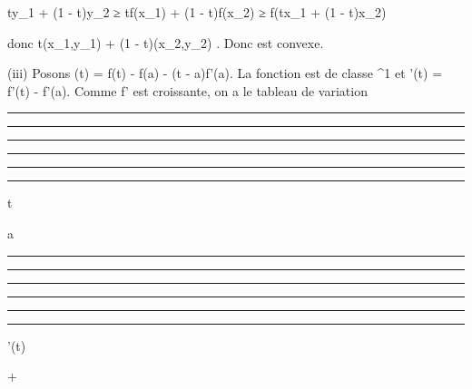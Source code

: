 \documentclass[]{article}
\begin{document}
ty\_1 + (1 - t)y\_2 ≥ tf(x\_1) + (1 -
t)f(x\_2) ≥ f(tx\_1 + (1 - t)x\_2)

donc t(x\_1,y\_1) + (1 - t)(x\_2,y\_2) \in
\Gamma. Donc \Gamma est convexe.

(iii) Posons \phi(t) = f(t) - f(a) - (t - a)f'(a). La fonction \phi est de
classe ^1 et \phi'(t) = f'(t) - f'(a). Comme f' est croissante,
on a le tableau de variation

\begin{center}\rule{3in}{0.4pt}\end{center}

\begin{center}\rule{3in}{0.4pt}\end{center}

\begin{center}\rule{3in}{0.4pt}\end{center}

\begin{center}\rule{3in}{0.4pt}\end{center}

\begin{center}\rule{3in}{0.4pt}\end{center}

\begin{center}\rule{3in}{0.4pt}\end{center}

t

a

\begin{center}\rule{3in}{0.4pt}\end{center}

\begin{center}\rule{3in}{0.4pt}\end{center}

\begin{center}\rule{3in}{0.4pt}\end{center}

\begin{center}\rule{3in}{0.4pt}\end{center}

\begin{center}\rule{3in}{0.4pt}\end{center}

\begin{center}\rule{3in}{0.4pt}\end{center}

\phi'(t)

+
\end{document}
